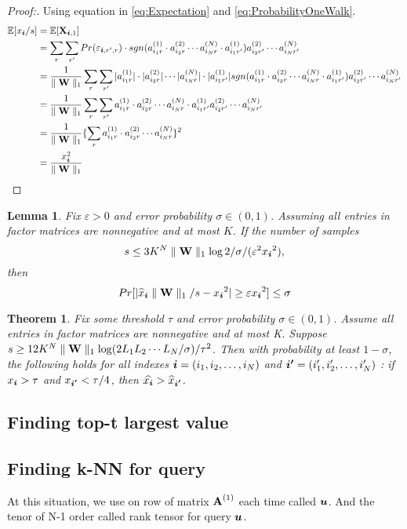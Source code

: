 \documentclass{article}
\newcommand{\Sca}[3]{{#1}^{(#2)}_{i_#2#3}}%
\newcommand{\V}[1]{{\bm{{\MakeLowercase{#1}}}}}%
\newcommand{\M}[1]{{\bm{\mathbf{\MakeUppercase{#1}}}}}%
\newcommand{\norm}[2]{\parallel#1\parallel_{#2}}
\newtheorem{lemma}{Lemma}[section]
\newtheorem{theorem}{Theorem}[section]
\begin{document}
\begin{proof}[Proof:]
Using equation in \ref{eq:Expectation} and \ref{eq:ProbabilityOneWalk}.
\begin{align*}
\mathbb{E}[x_{\V{i}}/s]
&= \mathbb{E}[\M{X}_{\V{i},1}]\\
&=\sum_{r}\sum_{r'}Pr(\varepsilon_{\V{i},r',r})\cdot sgn(\Sca{a}{1}{r}\cdot\Sca{a}{2}{r}\cdots\Sca{a}{N}{r}\cdot\Sca{a}{1}{r'})
\Sca{a}{2}{r'}\cdots\Sca{a}{N}{r'}\\
&=\frac{1}{\norm{\M{W}}{1}}\sum_{r}\sum_{r'}|\Sca{a}{1}{r}|\cdot|\Sca{a}{2}{r}|\cdots|\Sca{a}{N}{r}|\cdot|\Sca{a}{1}{r'}|sgn(\Sca{a}{1}{r}\cdot\Sca{a}{2}{r}\cdots\Sca{a}{N}{r}\cdot\Sca{a}{1}{r'})
\Sca{a}{2}{r'}\cdots\Sca{a}{N}{r'}\\
&=\frac{1}{\norm{\M{W}}{1}} \sum_{r}\sum_{r'} \Sca{a}{1}{r}\cdot\Sca{a}{2}{r}\cdots\Sca{a}{N}{r}\cdot\Sca{a}{1}{r'} \Sca{a}{2}{r'}\cdots\Sca{a}{N}{r'}\\
&=\frac{1}{\norm{\M{W}}{1}}\{\sum_{r}\Sca{a}{1}{r}\cdot\Sca{a}{2}{r}\cdots\Sca{a}{N}{r}\}^2\\
&=\frac{x_{\V{i}}^2}{\norm{\M{W}}{1}}
\end{align*}
\end{proof}



\begin{lemma}\label{Bound}
Fix $\varepsilon > 0$ and error probability $\sigma \in (0,1)$. Assuming all entries in factor matrices are nonnegative and at most $K$. If the number of samples
\[
s \leq 3K^N\norm{\M{W}}{1}\log{2/\sigma}/(\varepsilon ^2{x_{\V{i}}}^2),
\]
then
\[
Pr[|{\widehat{x}_{\V{i}}}\norm{\M{W}}{1}/s-{x_{\V{i}}}^2| \geq \varepsilon{x_{\V{i}}}^2] \leq \sigma
\]
\end{lemma}
\begin{theorem}
Fix some threshold $\tau$ and error probability $\sigma\in(0,1)$. Assume all entries in factor matrices are nonnegative and at most  K. Suppose $s \geq 12K^N\norm{\M{W}}{1}\log(2L_1L_2\cdots L_N/\sigma)/{\tau^2}$. Then with probability at least $1-\sigma$, the following holds for all indexes $\V{i} = (i_1,i_2,\ldots,i_N)$ and $\V{i'} = (i'_1,i'_2,\ldots,i'_N)$ : if $x_{\V{i}}>\tau$ and $ x_{\V{i'}} < \tau/4$, then $\widehat{x_{\V{i}}}>\widehat{x}_{\V{i'}}$.
\end{theorem}

\subsection{Finding top-t largest value}


\subsection{Finding k-NN for query}
At this situation, we use on row of matrix $\M{A}^{(1)}$ each time called $\V{u}$. And the tenor of N-1 order called rank tensor for query $\V{u}$.
\end{document}
